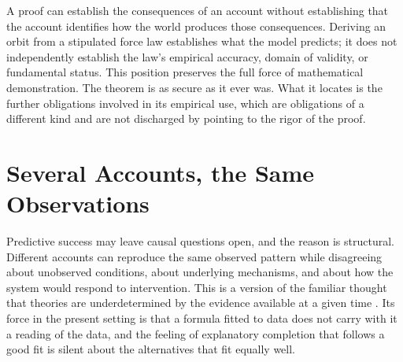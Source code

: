 \documentclass[11pt,letterpaper]{article}
\theoremstyle{definition}
\begin{document}
A proof can establish the consequences of an account without establishing that the account identifies how the world produces those consequences. Deriving an orbit from a stipulated force law establishes what the model predicts; it does not independently establish the law's empirical accuracy, domain of validity, or fundamental status. This position preserves the full force of mathematical demonstration. The theorem is as secure as it ever was. What it locates is the further obligations involved in its empirical use, which are obligations of a different kind and are not discharged by pointing to the rigor of the proof.

\section{Several Accounts, the Same Observations}

Predictive success may leave causal questions open, and the reason is structural. Different accounts can reproduce the same observed pattern while disagreeing about unobserved conditions, about underlying mechanisms, and about how the system would respond to intervention. This is a version of the familiar thought that theories are underdetermined by the evidence available at a given time \cite{duhem1906}. Its force in the present setting is that a formula fitted to data does not carry with it a reading of the data, and the feeling of explanatory completion that follows a good fit is silent about the alternatives that fit equally well.
\end{document}
